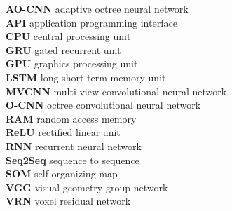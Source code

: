 \documentclass[12pt,a4paper]{report}
\begin{document}



\tableofcontents












\listoffigures

\listoftables

\textbf{AO-CNN} adaptive octree neural network\\
\textbf{API} application programming interface\\
\textbf{CPU} central processing unit\\
\textbf{GRU} gated recurrent unit\\
\textbf{GPU} graphics processing unit\\
\textbf{LSTM} long short-term memory unit\\
\textbf{MVCNN} multi-view convolutional neural network\\
\textbf{O-CNN} octree convolutional neural network\\
\textbf{RAM} random access memory\\
\textbf{ReLU} rectified linear unit\\
\textbf{RNN} recurrent neural network\\
\textbf{Seq2Seq} sequence to sequence\\
\textbf{SOM} self-organizing map\\
\textbf{VGG} visual geometry group network\\
\textbf{VRN} voxel residual network\\



\end{document}
